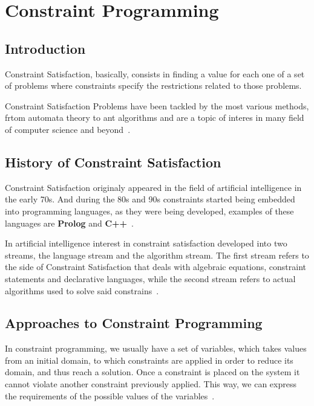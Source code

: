 \chapter{Constraint Programming}

\section{Introduction}

Constraint Satisfaction, basically, consists in finding a value for each one of a set of problems where constraints specify the restrictions related to those problems.

Constraint Satisfaction Problems have been tackled by the most various methods, frtom automata theory to ant algorithms and are a topic of interes in many field of computer science and beyond~\cite{Rossi2006}.

\section{History of Constraint Satisfaction}

Constraint Satisfaction originaly appeared in the field of artificial intelligence in the early 70s. And during the 80s and 90s constraints started being embedded into programming languages, as they were being developed, examples of these languages are \textbf{Prolog} and \textbf{C++}~\cite{Krzysztof2003}.

In artificial intelligence interest in constraint satisfaction developed into two streams, the language stream and the algorithm stream. The first stream refers to the side of Constraint Satisfaction that deals with algebraic equations, constraint statements and declarative languages, while the second stream refers to actual algorithms used to solve said constrains~\cite{Rossi2006}.

\section{Approaches to Constraint Programming}

In constraint programming, we usually have a set of variables, which takes values from an initial domain, to which constraints are applied in order to reduce its domain, and thus reach a solution. Once a constraint is placed on the system it cannot violate another constraint previously applied. This way, we can express the requirements of the possible values of the variables~\cite{Pearson1997}.

